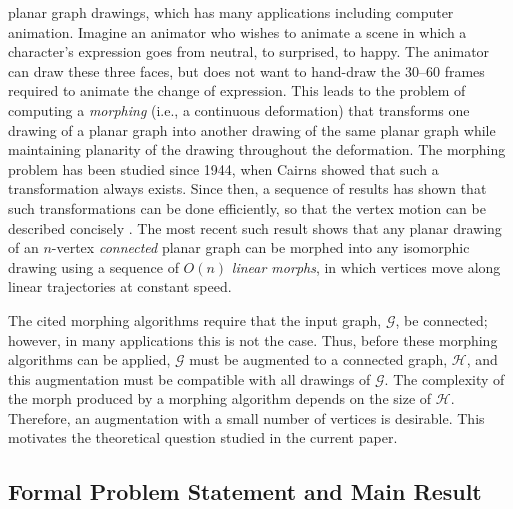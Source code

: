 \documentclass{patmorin}
\begin{document}
planar graph drawings, which has many applications \cite{erten.kobourov.ea:intersection,friedrich.eades:graph,gotsman.surazhsky:guaranteed,surazhsky.gotsman:controllable,surazhsky.gotsman:intrinsic} including
computer animation. Imagine an animator who wishes to animate a scene in which a character's expression
goes from neutral, to surprised, to happy. The animator can draw these
three faces, but does not want to hand-draw the 30--60 frames required
to animate the change of expression. This leads to the problem of computing a {\em morphing} (i.e., a continuous deformation) that transforms one drawing of a planar graph into
another drawing of the same planar graph while maintaining planarity
of the drawing throughout the deformation.
The morphing problem has been studied since 1944, when Cairns \cite{cairns:deformations}
showed that such a transformation always exists.  Since then, a sequence of results has shown
that such transformations can be done efficiently, so that the
vertex motion can be described concisely \cite{alamdari.angelini.ea:morphing,
angelini.dalozzo.ea:morphing,grunbaum.shephard:geometry,thomassen:deformations}.  The most recent such result
\cite{angelini.dalozzo.ea:morphing} shows that any planar drawing of
an $n$-vertex \emph{connected} planar graph can be morphed into any isomorphic
drawing using a sequence of $O(n)$ \emph{linear
morphs}, in which vertices move along linear trajectories at constant
speed.

The cited morphing algorithms require that the input graph, $\mathcal{G}$, be connected; however, in many applications this is not the case. Thus, before these morphing algorithms can be applied, $\mathcal{G}$ must be augmented to a connected graph, $\mathcal H$, and this augmentation must be compatible with all drawings of $\mathcal{G}$.  The complexity of the morph produced by a morphing algorithm depends on the size of $\mathcal H$.  Therefore, an augmentation with a small number of vertices is desirable. This motivates the theoretical question studied in the current paper.

\subsection{Formal Problem Statement and Main Result} 
\end{document}
